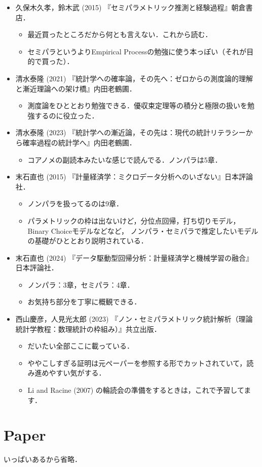 \documentclass{jsarticle}
\begin{document}
\begin{itemize}
  \item 久保木久孝，鈴木武 (2015) 『セミパラメトリック推測と経験過程』朝倉書店．
        \begin{itemize}
          \item 最近買ったところだから何とも言えない．これから読む．
          \item セミパラというよりEmpirical Processの勉強に使う本っぽい（それが目的で買った）．
        \end{itemize}  
  
  \item 清水泰隆 (2021) 『統計学への確率論，その先へ：ゼロからの測度論的理解と漸近理論への架け橋』内田老鶴圃．
        \begin{itemize}
          \item 測度論をひととおり勉強できる．優収束定理等の積分と極限の扱いを勉強するのに役立った．
        \end{itemize} 
    
  \item 清水泰隆 (2023) 『統計学への漸近論，その先は：現代の統計リテラシーから確率過程の統計学へ』内田老鶴圃．
        \begin{itemize}
          \item コアノメの副読本みたいな感じで読んでる．ノンパラは5章．
        \end{itemize}

  \item 末石直也 (2015) 『計量経済学：ミクロデータ分析へのいざない』日本評論社．
        \begin{itemize}
          \item ノンパラを扱ってるのは9章．
          \item パラメトリックの枠は出ないけど，分位点回帰，打ち切りモデル，Binary Choiceモデルなどなど，
                ノンパラ・セミパラで推定したいモデルの基礎がひととおり説明されている．
        \end{itemize}
  
  \item 末石直也 (2024) 『データ駆動型回帰分析：計量経済学と機械学習の融合』日本評論社．
        \begin{itemize}
          \item ノンパラ：3章，セミパラ：4章．
          \item お気持ち部分を丁寧に概観できる．
        \end{itemize}

  \item 西山慶彦，人見光太郎 (2023) 『ノン・セミパラメトリック統計解析（理論統計学教程：数理統計の枠組み）』共立出版．
        \begin{itemize}
          \item だいたい全部ここに載っている．
          \item ややこしすぎる証明は元ペーパーを参照する形でカットされていて，読み進めやすい気がする．
          \item Li and Racine (2007) の輪読会の準備をするときは，これで予習してます．
        \end{itemize}
\end{itemize}

\section{Paper}
いっぱいあるから省略．
\end{document}
